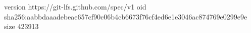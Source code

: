 version https://git-lfs.github.com/spec/v1
oid sha256:aabbdaaadebeae657cf90c06b4cb6673f76cf4ed6e1e3046ac874769e0299e9e
size 423913
